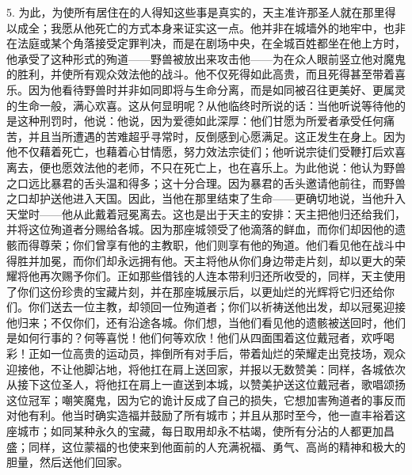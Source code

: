 5. 为此，为使所有居住在的人得知这些事是真实的，天主准许那圣人就在那里得以成全；我愿从他死亡的方式本身来证实这一点。他并非在城墙外的地牢中，也非在法庭或某个角落接受定罪判决，而是在剧场中央，在全城百姓都坐在他上方时，他承受了这种形式的殉道——野兽被放出来攻击他——为在众人眼前竖立他对魔鬼的胜利，并使所有观众效法他的战斗。他不仅死得如此高贵，而且死得甚至带着喜乐。因为他看待野兽时并非如同即将与生命分离，而是如同被召往更美好、更属灵的生命一般，满心欢喜。这从何显明呢？从他临终时所说的话：当他听说等待他的是这种刑罚时，他说：他说，因为爱德如此深厚：他们甘愿为所爱者承受任何痛苦，并且当所遭遇的苦难超乎寻常时，反倒感到心愿满足。这正发生在身上。因为他不仅藉着死亡，也藉着心甘情愿，努力效法宗徒们；他听说宗徒们受鞭打后欢喜离去，便也愿效法他的老师，不只在死亡上，也在喜乐上。为此他说：他认为野兽之口远比暴君的舌头温和得多；这十分合理。因为暴君的舌头邀请他前往，而野兽之口却护送他进入天国。因此，当他在那里结束了生命——更确切地说，当他升入天堂时——他从此戴着冠冕离去。这也是出于天主的安排：天主把他归还给我们，并将这位殉道者分赐给各城。因为那座城领受了他滴落的鲜血，而你们却因他的遗骸而得尊荣；你们曾享有他的主教职，他们则享有他的殉道。他们看见他在战斗中得胜并加冕，而你们却永远拥有他。天主将他从你们身边带走片刻，却以更大的荣耀将他再次赐予你们。正如那些借钱的人连本带利归还所收受的，同样，天主使用了你们这份珍贵的宝藏片刻，并在那座城展示后，以更灿烂的光辉将它归还给你们。你们送去一位主教，却领回一位殉道者；你们以祈祷送他出发，却以冠冕迎接他归来；不仅你们，还有沿途各城。你们想，当他们看见他的遗骸被送回时，他们是如何行事的？何等喜悦！他们何等欢欣！他们从四面围着这位戴冠者，欢呼喝彩！正如一位高贵的运动员，摔倒所有对手后，带着灿烂的荣耀走出竞技场，观众迎接他，不让他脚沾地，将他扛在肩上送回家，并报以无数赞美：同样，各城依次从接下这位圣人，将他扛在肩上一直送到本城，以赞美护送这位戴冠者，歌唱颂扬这位冠军；嘲笑魔鬼，因为它的诡计反成了自己的损失，它想加害殉道者的事反而对他有利。他当时确实造福并鼓励了所有城市；并且从那时至今，他一直丰裕着这座城市；如同某种永久的宝藏，每日取用却永不枯竭，使所有分沾的人都更加昌盛；同样，这位蒙福的也使来到他面前的人充满祝福、勇气、高尚的精神和极大的胆量，然后送他们回家。\par

